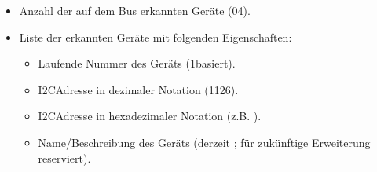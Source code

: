 \documentclass[letterpaper,10pt,english]{sphinxmanual}
\begin{document}
\sphinxAtStartPar
{}
\begin{itemize}
\item {} 
\sphinxAtStartPar
{}  \textendash{} Anzahl der auf dem Bus erkannten Geräte (0\textendash{}4).

\item {} 
\sphinxAtStartPar
{}  \textendash{} Liste der erkannten Geräte mit folgenden Eigenschaften:
\begin{itemize}
\item {} 
\sphinxAtStartPar
{}  \textendash{} Laufende Nummer des Geräts (1\sphinxhyphen{}basiert).

\item {} 
\sphinxAtStartPar
{}  \textendash{} I2C\sphinxhyphen{}Adresse in dezimaler Notation (1\textendash{}126).

\item {} 
\sphinxAtStartPar
{}  \textendash{} I2C\sphinxhyphen{}Adresse in hexadezimaler Notation (z.B. ).

\item {} 
\sphinxAtStartPar
{}  \textendash{} Name/Beschreibung des Geräts (derzeit ; für zukünftige Erweiterung reserviert).

\end{itemize}

\end{itemize}

\sphinxAtStartPar
{}

\begin{sphinxVerbatim}[commandchars=\\\{\}]
\end{sphinxVerbatim}
\end{document}
